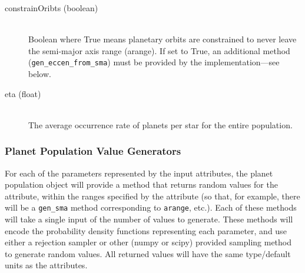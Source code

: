 \documentclass[cleanfoot]{asme2ej}
\begin{document}
\begin{itemize}
\begin{description}
    \item[constrainOribts (boolean)] \hfill \\ Boolean where True means planetary orbits are constrained to never leave the semi-major axis range (arange). If set to True, an additional method (\verb+gen_eccen_from_sma+) must be provided by the implementation---see below.
    \item[eta (float)] \hfill \\ The average occurrence rate of planets per star for the entire population.
\end{description}
\end{itemize}

\subsubsection{Planet Population Value Generators} \label{sec:pdfs}
For each of the parameters represented by the input attributes, the planet population object will provide a method that returns random values for the attribute, within the ranges specified by the attribute (so that, for example, there will be a \verb+gen_sma+ method corresponding to \verb+arange+, etc.).  Each of these methods will take a single input of the number of values to generate.  These methods will encode the probability density functions representing each parameter, and use either a rejection sampler or other (numpy or scipy) provided sampling method to generate random values.  All returned values will have the same type/default units as the attributes. 
\end{document}
